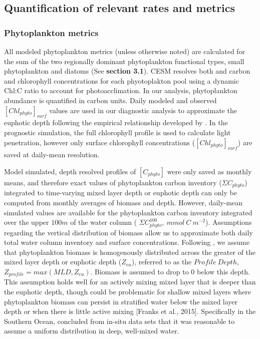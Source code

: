 \subsection{Quantification of relevant rates and metrics}

\subsubsection{Phytoplankton metrics}

All modeled phytoplankton metrics (unless otherwise noted) are calculated for the sum of the two regionally dominant phytoplankton functional types, small phytoplankton and diatoms (See \textbf{section 3.1}). CESM resolves both and carbon and chlorophyll concentrations for each phyotoplakton pool using a dynamic Chl:C ratio to account for photoacclimation. In our analysis, phytoplankton abundance is quantified in carbon units. Daily modeled and observed $[Chl_{phyto}]_{surf}$ values are used in our diagnostic analysis to approximate the euphotic depth following the empirical relationship developed by \parencite{MorelSurfacepigmentsalgal1989}. In the prognostic simulation, the full chlorophyll profile is used to calculate light penetration, however only surface chlorophyll concentrations ($[Chl_{phyto}]_{surf}$) are saved at daily-mean resolution.

Model simulated, depth resolved profiles of $[C_{phyto}]$ were only saved as monthly means, and therefore exact values of phytoplankton carbon inventory ($\Sigma C_{phyto}$) integrated to time-varying mixed layer depth or euphotic depth can only be computed from monthly averages of biomass and depth. However, daily-mean simulated values are available for the phytoplankton carbon inventory integrated over the upper $100m$ of the water column ( $\Sigma C^{100}_{phyto}, \: mmol \: C \: m^{-2}$). Assumptions regarding the vertical distribution of biomass allow us to approximate both daily total water column inventory and surface concentrations. Following \textcite{BehrenfeldAnnualcyclesecological2013}, we assume that phytoplankton biomass is homogenously distributed across the greater of the mixed layer depth or euphotic depth ($Z_{eu}$), referred to as the $Profile \: Depth$, $Z_{profile} = max(MLD, Z_{eu})$. Biomass is assumed to drop to 0 below this depth. This assumption holds well for an actively mixing mixed layer that is deeper than the euphotic depth, though could be problematic for shallow mixed layers where phytoplankton biomass can persist in stratified water below the mixed layer depth \parencite{BossObservationspigmentparticle2008, Bosssituevaluationinitiation2010,BehrenfeldAnnualcyclesecological2013} or when there is little active mixing [Franks et al., 2015]. Specifically in the Southern Ocean, \parencite{UitzVerticaldistributionphytoplankton2006} concluded from in-situ data sets that it was reasonable to assume a uniform distribution in deep, well-mixed water.

